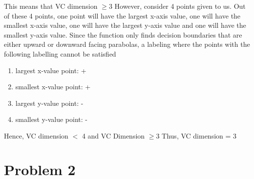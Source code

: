\documentclass[11pt]{article}
\begin{document}
\begin{enumerate}
This means that VC dimension $\geq 3$ \newline
However, consider 4 points given to us. Out of these 4 points, one point 
will have the largest x-axis value, one will have the smallest x-axis value,
one will have the largest y-axis value and one will have the smallest y-axis value.
Since the function only finds decision boundaries that are either upward
or downward facing parabolas, a labeling where the points with the following labelling
cannot be satisfied
\begin{enumerate}
\item largest x-value point: +
\item smallest x-value point: +
\item largest y-value point: -
\item smallest y-value point: -
\end{enumerate}

Hence, VC dimension $<$ 4 and VC Dimension $\geq 3$ \newline
Thus, VC dimension = 3 

\end{enumerate}

\newpage
\section{Problem 2}
\end{document}
